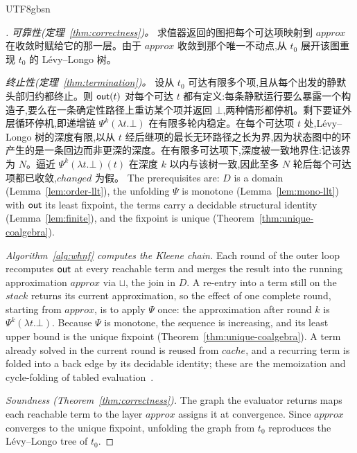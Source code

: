 \begin{CJK*}{UTF8}{gbsn}
\begin{proof}[]
    \emph{可靠性(定理~\ref{thm:correctness})。} 求值器返回的图把每个可达项映射到 $\mathit{approx}$ 在收敛时赋给它的那一层。由于 $\mathit{approx}$ 收敛到那个唯一不动点,从 $t_0$ 展开该图重现 $t_0$ 的 Lévy--Longo 树。

    \emph{终止性(定理~\ref{thm:termination})。} 设从 $t_0$ 可达有限多个项,且从每个出发的静默头部归约都终止。则 $\mathsf{out}(t)$ 对每个可达 $t$ 都有定义:每条静默运行要么暴露一个构造子,要么在一条确定性路径上重访某个项并返回 $\bot$,两种情形都停机。剩下要证外层循环停机,即递增链 $\Psi^k(\lambda t.\bot)$ 在有限多轮内稳定。在每个可达项 $t$ 处,Lévy--Longo 树的深度有限,以从 $t$ 经后继项的最长无环路径之长为界,因为状态图中的环产生的是一条回边而非更深的深度。在有限多可达项下,深度被一致地界住:记该界为 $N$。逼近 $\Psi^k(\lambda t.\bot)(t)$ 在深度 $k$ 以内与该树一致,因此至多 $N$ 轮后每个可达项都已收敛,$\mathit{changed}$ 为假。
    \else
    The prerequisites are: $D$ is a domain (Lemma~\ref{lem:order-llt}), the unfolding $\Psi$ is monotone (Lemma~\ref{lem:mono-llt}) with $\mathsf{out}$ its least fixpoint, the terms carry a decidable structural identity (Lemma~\ref{lem:finite}), and the fixpoint is unique (Theorem~\ref{thm:unique-coalgebra}).

    \emph{Algorithm~\ref{alg:whnf} computes the Kleene chain.} Each round of the outer loop recomputes $\mathsf{out}$ at every reachable term and merges the result into the running approximation $\mathit{approx}$ via $\sqcup$, the join in $D$. A re-entry into a term still on the $\mathit{stack}$ returns its current approximation, so the effect of one complete round, starting from $\mathit{approx}$, is to apply $\Psi$ once: the approximation after round $k$ is $\Psi^k(\lambda t.\bot)$. Because $\Psi$ is monotone, the sequence is increasing, and its least upper bound is the unique fixpoint (Theorem~\ref{thm:unique-coalgebra}). A term already solved in the current round is reused from $\mathit{cache}$, and a recurring term is folded into a back edge by its decidable identity; these are the memoization and cycle-folding of tabled evaluation~\cite{vanemden1976-predicate-logic-semantics, tamaki1986-tabled-resolution, chen1996-tabled-evaluation-delaying}.

    \emph{Soundness (Theorem~\ref{thm:correctness}).} The graph the evaluator returns maps each reachable term to the layer $\mathit{approx}$ assigns it at convergence. Since $\mathit{approx}$ converges to the unique fixpoint, unfolding the graph from $t_0$ reproduces the L\'evy--Longo tree of $t_0$.


\end{proof}
\end{CJK*}
